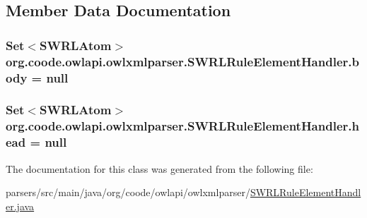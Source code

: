 \subsection{Member Data Documentation}
\hypertarget{classorg_1_1coode_1_1owlapi_1_1owlxmlparser_1_1_s_w_r_l_rule_element_handler_ad62eeeac241bcdf5b75a0567111f2c08}{
\subsubsection[{body}]{\setlength{\rightskip}{0pt plus 5cm}Set$<${\bf S\-W\-R\-L\-Atom}$>$ org.\-coode.\-owlapi.\-owlxmlparser.\-S\-W\-R\-L\-Rule\-Element\-Handler.\-body = null\hspace{0.3cm}{\ttfamily [private]}}}\label{classorg_1_1coode_1_1owlapi_1_1owlxmlparser_1_1_s_w_r_l_rule_element_handler_ad62eeeac241bcdf5b75a0567111f2c08}
\hypertarget{classorg_1_1coode_1_1owlapi_1_1owlxmlparser_1_1_s_w_r_l_rule_element_handler_a8d0625d70191c3547a76af1d6284263c}{
\subsubsection[{head}]{\setlength{\rightskip}{0pt plus 5cm}Set$<${\bf S\-W\-R\-L\-Atom}$>$ org.\-coode.\-owlapi.\-owlxmlparser.\-S\-W\-R\-L\-Rule\-Element\-Handler.\-head = null\hspace{0.3cm}{\ttfamily [private]}}}\label{classorg_1_1coode_1_1owlapi_1_1owlxmlparser_1_1_s_w_r_l_rule_element_handler_a8d0625d70191c3547a76af1d6284263c}


The documentation for this class was generated from the following file\-:\begin{DoxyCompactItemize}
\item 
parsers/src/main/java/org/coode/owlapi/owlxmlparser/\hyperlink{_s_w_r_l_rule_element_handler_8java}{S\-W\-R\-L\-Rule\-Element\-Handler.\-java}\end{DoxyCompactItemize}
